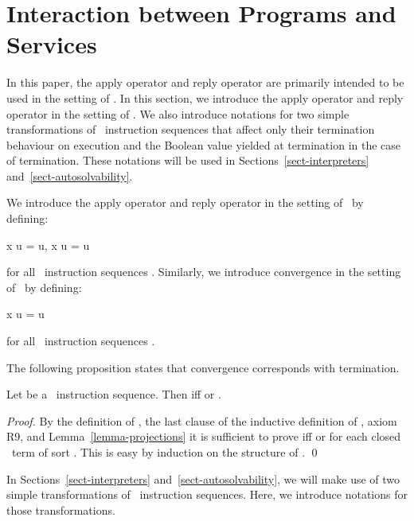 \documentclass[fleqn]{llncs}
\begin{document}
\section{Interaction between Programs and Services}
\label{sect-PGLBbt-add}

In this paper, the apply operator and reply operator are primarily
intended to be used in the setting of \PGLBbt.
In this section, we introduce the apply operator and reply operator in
the setting of \PGLBbt.
We also introduce notations for two simple transformations of \PGLBbt\
instruction sequences that affect only their termination behaviour on
execution and the Boolean value yielded at termination in the case of
termination.
These notations will be used in Sections~\ref{sect-interpreters}
and~\ref{sect-autosolvability}.

We introduce the apply operator and reply operator in the setting of
\PGAbt\ by defining:
\begin{ldispl}
x \sfapply u =  \sfapply u\;, \quad
x \sfreply u = \extr{x} \sfreply u
\end{ldispl}
for all \PGLBbt\ instruction sequences .
Similarly, we introduce convergence in the setting of \PGAbt\ by
defining:
\begin{ldispl}
x \cvg u =  \cvg u
\end{ldispl}
for all \PGLBbt\ instruction sequences .

The following proposition states that convergence corresponds with
termination.
\begin{proposition}
\label{prop-cvg-sfreply}
Let  be a \PGLBbt\ instruction sequence.
Then  iff  or .
\end{proposition}
\begin{proof}
By the definition of , the last clause of the inductive
definition of , axiom R9, and Lemma~\ref{lemma-projections} it is
sufficient to prove  iff  or
 for each closed \BTAbt\ term  of sort .
This is easy by induction on the structure of .
\qed
\end{proof}

In Sections~\ref{sect-interpreters} and~\ref{sect-autosolvability}, we
will make use of two simple transformations of \PGLBbt\ instruction
sequences.
Here, we introduce notations for those transformations.
\end{document}
